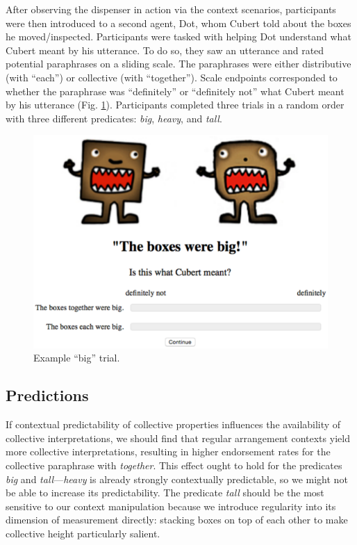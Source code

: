 \documentclass[linguex]{sp}
\begin{document}
After observing the dispenser in action via the context  scenarios, participants were then introduced to a second agent, Dot, whom Cubert told about the boxes he moved/inspected. Participants were tasked with helping Dot understand what Cubert meant by his utterance. To do so, they saw an utterance and rated potential paraphrases on a sliding scale. The paraphrases were either distributive (with  ``each'') or collective (with ``together'').  Scale endpoints corresponded to whether the paraphrase was ``definitely'' or ``definitely not'' what Cubert meant by his utterance (Fig. \ref{trial}). Participants completed three trials in a random order with three different predicates: \emph{big}, \emph{heavy}, and \emph{tall}.


\begin{figure}[h]
\centering
\includegraphics[width=4.5in]{images/trial.eps}
\caption{Example ``big'' trial.}\label{trial}
\end{figure}

\subsection{Predictions}

If contextual predictability of collective properties influences the availability of collective interpretations, we should find that regular arrangement contexts yield more collective interpretations, resulting in higher endorsement rates for the collective paraphrase with \emph{together}. This effect ought to hold for the predicates \emph{big} and \emph{tall}---\emph{heavy} is already strongly contextually predictable, so we might not be able to increase its predictability. The predicate \emph{tall} should be the most sensitive to our context manipulation because we introduce regularity into its dimension of measurement directly: stacking boxes on top of each other to make collective height particularly salient.
\end{document}
